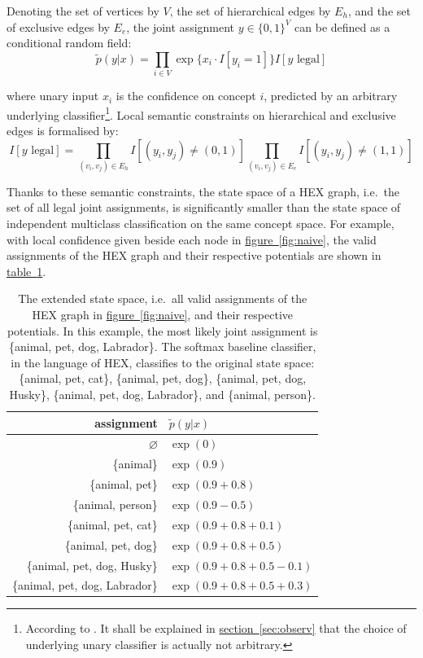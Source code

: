 \documentclass[11pt,a4paper]{article}
\begin{document}
Denoting the set of vertices by $V$, the set of hierarchical edges by $E_h$, and the set of exclusive edges by $E_e$, the joint assignment $y\in\{0,1\}^V$ can be defined as a conditional random field:
\begin{equation}
\tilde{p}(y|x)=\prod_{i\in V}\exp\{x_i\cdot I[y_i=1]\}I[y\text{ legal}]
\label{eqn:naive}
\end{equation}

where unary input $x_i$ is the confidence on concept $i$, predicted by an arbitrary underlying classifier\footnote{According to \cite{deng2014large}. It shall be explained in \hyperref[sec:observ]{section~\ref{sec:observ}} that the choice of underlying unary classifier is actually not arbitrary.}. Local semantic constraints on hierarchical and exclusive edges is formalised by:
\begin{equation}
I[y\text{ legal}]=\prod_{(v_i,v_j)\in E_h}I[(y_i,y_j)\neq(0,1)]\prod_{(v_i,v_j)\in E_e}I[(y_i,y_j)\neq(1,1)]
\label{eqn:legal}
\end{equation}

Thanks to these semantic constraints, the state space of a HEX graph, i.e.\ the set of all legal joint assignments, is significantly smaller than the state space of independent multiclass classification on the same concept space. For example, with local confidence given beside each node in \hyperref[fig:naive]{figure~\ref{fig:naive}}, the valid assignments of the HEX graph and their respective potentials are shown in \hyperref[tab:naive]{table~\ref{tab:naive}}.

\begin{table}[htbp]
\centering
\begin{tabular}{r|l}
assignment & $\tilde{p}(y|x)$\\
\hline
$\varnothing$ & $\exp(0)$\\
\{animal\} & $\exp(0.9)$\\
\{animal, pet\} & $\exp(0.9+0.8)$\\
\{animal, person\} & $\exp(0.9-0.5)$\\
\{animal, pet, cat\} & $\exp(0.9+0.8+0.1)$\\
\{animal, pet, dog\} & $\exp(0.9+0.8+0.5)$\\
\{animal, pet, dog, Husky\} & $\exp(0.9+0.8+0.5-0.1)$\\
\{animal, pet, dog, Labrador\} & $\exp(0.9+0.8+0.5+0.3)$
\end{tabular}
\caption{The extended state space, i.e.\ all valid assignments of the HEX graph in \hyperref[fig:naive]{figure~\ref{fig:naive}}, and their respective potentials. In this example, the most likely joint assignment is \{animal, pet, dog, Labrador\}. The softmax baseline classifier, in the language of HEX, classifies to the original state space: \{animal, pet, cat\}, \{animal, pet, dog\}, \{animal, pet, dog, Husky\}, \{animal, pet, dog, Labrador\}, and \{animal, person\}.}
\label{tab:naive}
\end{table}
\end{document}
